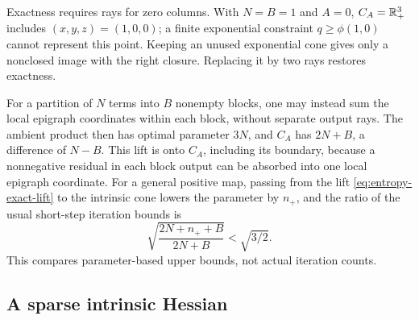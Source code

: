 Exactness requires rays for zero columns.  With
$N=B=1$ and
$A=0$, $C_A=\mathbb R_+^3$ includes $(x,y,z)=(1,0,0)$; a finite exponential
constraint $q\geq\phi(1,0)$ cannot represent this point.  Keeping an
unused exponential cone gives only a nonclosed image with the right
closure.  Replacing it by two rays restores exactness.

For a partition of $N$ terms into $B$ nonempty blocks, one may instead
sum the local epigraph coordinates within each block, without separate
output rays.  The ambient product then has optimal parameter $3N$,
and $C_A$ has $2N+B$, a difference of $N-B$.  This lift is onto $C_A$,
including its boundary, because a nonnegative residual in each block
output can be absorbed into one local epigraph coordinate.  For a
general positive map, passing from the lift
\eqref{eq:entropy-exact-lift} to the intrinsic cone lowers the
parameter by $n_+$, and the ratio of the usual short-step iteration
bounds is
\[
 \sqrt{\frac{2N+n_++B}{2N+B}}<\sqrt{3/2}.
\]
This compares parameter-based upper bounds, not actual iteration counts.

\subsection{A sparse intrinsic Hessian}

